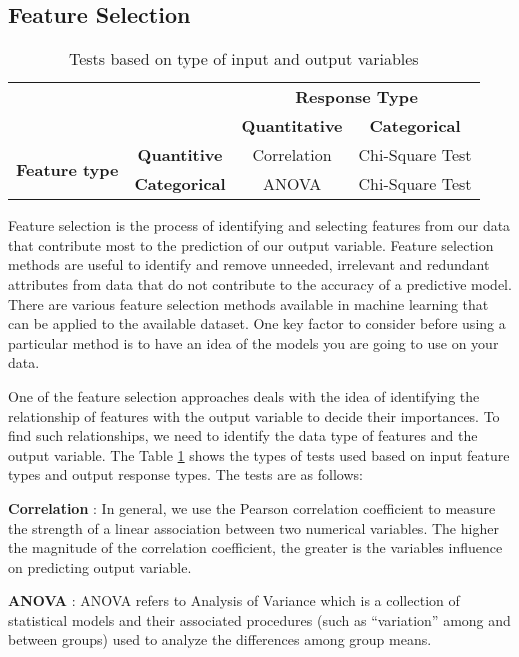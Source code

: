 \documentclass[11pt,openright]{report}
\begin{document}
\subsection {Feature Selection}
\begin{table}
	\renewcommand{\arraystretch}{1.3}
	\caption{Tests based on type of input and output variables}
	\label{table:statistical_db}
	\centering
	\begin{tabular}{|c|c|c|c|}
    \hline
    \multicolumn{2}{|c|}{} & \multicolumn{2}{|c|}{ \bfseries Response Type}\\ \cline{3-4}
      \multicolumn{2}{|c|}{} & \bfseries Quantitative & \bfseries Categorical\\ \hline
     \multirow{2}{*}{ \bfseries Feature type}   &  \bfseries Quantitive & Correlation & Chi-Square Test \\ \cline{2-4}
     & \bfseries Categorical & ANOVA & Chi-Square Test\\
    \hline

\end{tabular}
\end{table}
Feature selection is the process of identifying and selecting features from our data that contribute most to the prediction of our output variable. Feature selection methods are useful to identify and remove unneeded, irrelevant and redundant attributes from data that do not contribute to the accuracy of a predictive model. There are various feature selection methods available in machine learning that can be applied to the available dataset. One key factor to consider before using a particular method is to have an idea of the models you are going to use on your data. 

One of the feature selection approaches deals with the idea of identifying the relationship of features with the output variable to decide their importances. To find such relationships, we need to identify the data type of features and the output variable. The Table \ref{table:statistical_db} shows the types of tests used based on input feature types and output response types. The tests are as follows: 

\noindent \textbf{Correlation} : In general, we use the Pearson correlation coefficient to measure the strength of a linear association between two numerical variables. The higher the magnitude of the correlation coefficient, the greater is the variables influence on predicting output variable.

\noindent \textbf{ANOVA} : ANOVA refers to Analysis of Variance which is a collection of statistical models and their associated procedures (such as ``variation'' among and between groups) used to analyze the differences among group means.
\end{document}
